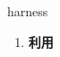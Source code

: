 
\begin{frame}
{\huge harness}
\begin{center}
\begin{enumerate}\Large
  \item \textbf{利用}
\end{enumerate}
\end{center}
\end{frame}
